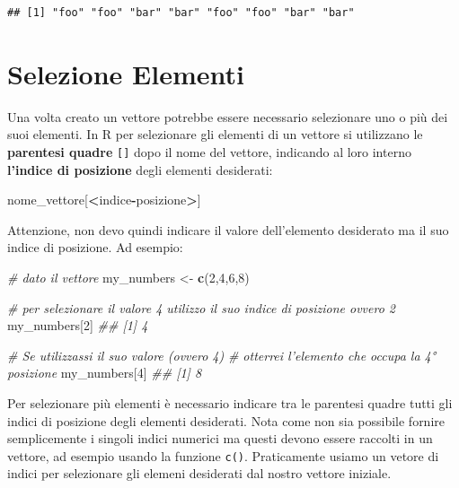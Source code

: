 \documentclass[
]{book}
\newenvironment{Shaded}{\begin{snugshade}}{\end{snugshade}}
\newcommand{\CommentTok}[1]{\textcolor[rgb]{0.56,0.35,0.01}{\textit{#1}}}
\newcommand{\DecValTok}[1]{\textcolor[rgb]{0.00,0.00,0.81}{#1}}
\newcommand{\KeywordTok}[1]{\textcolor[rgb]{0.13,0.29,0.53}{\textbf{#1}}}
\newcommand{\NormalTok}[1]{#1}
\newcommand{\OperatorTok}[1]{\textcolor[rgb]{0.81,0.36,0.00}{\textbf{#1}}}
\newcommand{\StringTok}[1]{\textcolor[rgb]{0.31,0.60,0.02}{#1}}
\begin{document}
\begin{verbatim}
## [1] "foo" "foo" "bar" "bar" "foo" "foo" "bar" "bar"
\end{verbatim}

\hypertarget{vector-selection}{%
\section{Selezione Elementi}\label{vector-selection}}

Una volta creato un vettore potrebbe essere necessario selezionare uno o più dei suoi elementi. In R per selezionare gli elementi di un vettore si utilizzano le \textbf{parentesi quadre} \texttt{{[}{]}} dopo il nome del vettore, indicando al loro interno \textbf{l'indice di posizione} degli elementi desiderati:

\begin{Shaded}
\begin{Highlighting}[]
\NormalTok{nome_vettore[}\OperatorTok{<}\NormalTok{indice}\OperatorTok{-}\NormalTok{posizione}\OperatorTok{>}\NormalTok{]}
\end{Highlighting}
\end{Shaded}

Attenzione, non devo quindi indicare il valore dell'elemento desiderato ma il suo indice di posizione. Ad esempio:

\begin{Shaded}
\begin{Highlighting}[]
\CommentTok{# dato il vettore}
\NormalTok{my_numbers <-}\StringTok{ }\KeywordTok{c}\NormalTok{(}\DecValTok{2}\NormalTok{,}\DecValTok{4}\NormalTok{,}\DecValTok{6}\NormalTok{,}\DecValTok{8}\NormalTok{)}

\CommentTok{# per selezionare il valore 4 utilizzo il suo indice di posizione ovvero 2}
\NormalTok{my_numbers[}\DecValTok{2}\NormalTok{]}
\CommentTok{## [1] 4}

\CommentTok{# Se utilizzassi il suo valore (ovvero 4) }
\CommentTok{# otterrei l'elemento che occupa la 4° posizione}
\NormalTok{my_numbers[}\DecValTok{4}\NormalTok{]}
\CommentTok{## [1] 8}
\end{Highlighting}
\end{Shaded}

Per selezionare più elementi è necessario indicare tra le parentesi quadre tutti gli indici di posizione degli elementi desiderati. Nota come non sia possibile fornire semplicemente i singoli indici numerici ma questi devono essere raccolti in un vettore, ad esempio usando la funzione \texttt{c()}. Praticamente usiamo un vetore di indici per selezionare gli elemeni desiderati dal nostro vettore iniziale.
\end{document}
